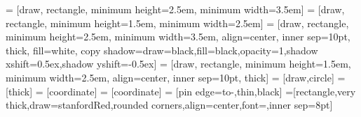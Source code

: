 \usepackage{amsmath,amssymb,amsfonts,bm,mathtools}



\usepackage{tikz,pgfplots}
\usetikzlibrary{backgrounds,positioning,intersections,patterns,calc,cd,fit,
  quotes,math,decorations.pathmorphing,decorations.markings,shadows,shapes,
  automata,arrows,arrows.meta}
\pgfplotsset{compat=1.16}


 = [draw, rectangle, minimum height=2.5em, minimum width=3.5em]
 = [draw, rectangle, minimum height=1.5em, minimum width=2.5em]
 = [draw, rectangle, minimum height=2.5em, minimum width=3.5em, align=center, inner sep=10pt, thick, fill=white, copy shadow={draw=black,fill=black,opacity=1,shadow xshift=0.5ex,shadow yshift=-0.5ex}]
 = [draw, rectangle, minimum height=1.5em, minimum width=2.5em, align=center, inner sep=10pt, thick]
 = [draw,circle]
 = [thick]
 = [coordinate]
 = [coordinate]
 = [pin edge={to-,thin,black}]
=[rectangle,very thick,draw=stanfordRed,rounded corners,align=center,font=\normalsize,inner sep=8pt]
